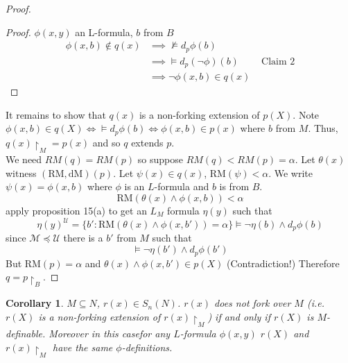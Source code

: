 \documentclass[letterpaper, 12pt]{article}
\newcommand{\cU}{\mathcal{U}}
\newcommand{\cM}{\mathcal{M}}
\newcommand{\RM}{\mbox{RM}}
\newcommand{\dM}{\mbox{dM}}
\theoremstyle{stdthm}
\newtheorem{cor}[thm]{Corollary}
\theoremstyle{stddef}
\theoremstyle{stdnonum}
\theoremstyle{stdqands}
\theoremstyle{stdbold}
\begin{document}
\begin{proof}
\begin{proof}
$\phi(x,y)$ an L-formula, $b$ from $B$ 
\begin{align*}
\phi(x,b) \notin q(x) & \implies \nvDash d_p \phi(b) \\
& \implies \models d_p (\neg \phi) (b) & \text{ Claim 2} \\
& \implies \neg \phi(x,b) \in q(x) 
\end{align*}
\end{proof}
It remains to show that $q(x)$ is a non-forking extension of $p(X)$. Note $\phi(x,b) \in q(X) \iff \models d_p \phi(b)\iff \phi(x,b) \in p(x)$ where $b$ from $M$. Thus, $q(x)	\upharpoonright_M = p(x)$ and so $q$ extends $p$.\\

We need $RM(q) = RM(p)$ so suppose $RM(q) < RM(p) = \alpha$. Let $\theta(x)$ witness $(\RM,\dM)(p)$. Let $\psi(x) \in q(x)$, $\RM(\psi) < \alpha$. We write $\psi(x) = \phi(x,b)$ where $\phi$ is an $L$-formula and $b$ is from $B$.
\[ \RM(\theta(x) \wedge \phi(x,b)) < \alpha \]
apply proposition 15(a) to get an $L_M$ formula $\eta(y)$ such that 
\[ \eta(y)^\cU = \{b': \RM(\theta(x) \wedge \phi(x,b')) = \alpha\} \models \neg \eta(b) \wedge d_p \phi(b)  \]
since $\cM \preceq \cU$ there is a $b'$ from $M$ such that 
\[ \models \neg \eta(b') \wedge d_p \phi(b') \]
But $\RM(p) = \alpha$ and $\theta(x) \wedge \phi(x,b') \in p(X)$ (Contradiction!) Therefore $q = p \upharpoonright_B$.    
\end{proof}


\begin{cor}
$M \subseteq N$, $r(x) \in S_n(N)$. $r(x)$ does not fork over $M$ (i.e. $r(X)$ is a non-forking extension of $r(x)\upharpoonright_M$) if and only if $r(X)$ is $M$-definable.  Moreover in this casefor any $L$-formula $\phi(x,y)$ $r(X)$ and $r(x)\upharpoonright_M$ have the same $\phi$-definitions. 
\end{cor} 
\end{document}

